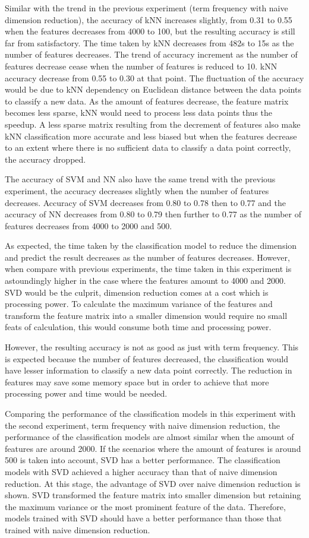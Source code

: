 Similar with the trend in the previous experiment (term frequency with naive dimension reduction), the accuracy of kNN increases slightly, from 0.31 to 0.55 when the features decreases from 4000 to 100, but the resulting accuracy is still far from satisfactory. The time taken by kNN decreases from 482s to 15s as the number of features decreases. The trend of accuracy increment as the number of features decrease cease when the number of features is reduced to 10. kNN accuracy decrease from 0.55 to 0.30 at that point. The fluctuation of the accuracy would be due to kNN dependency on Euclidean distance between the data points to classify a new data. As the amount of features decrease, the feature matrix becomes less sparse, kNN would need to process less data points thus the speedup. A less sparse matrix resulting from the decrement of features also make kNN classification more accurate and less biased but when the features decrease to an extent where there is no sufficient data to classify a data point correctly, the accuracy dropped.

The accuracy of SVM and NN also have the same trend with the previous experiment, the accuracy decreases slightly when the number of features decreases. Accuracy of SVM decreases from 0.80 to 0.78 then to 0.77 and the accuracy of NN decreases from 0.80 to 0.79 then further to 0.77 as the number of features decreases from 4000 to 2000 and 500.

As expected, the time taken by the classification model to reduce the dimension and predict the result decreases as the number of features decreases. However, when compare with previous experiments, the time taken in this experiment is astoundingly higher in the case where the features amount to 4000 and 2000. SVD would be the culprit, dimension reduction comes at a cost which is processing power. To calculate the maximum variance of the features and transform the feature matrix into a smaller dimension would require no small feats of calculation, this would consume both time and processing power.

However, the resulting accuracy is not as good as just with term frequency. This is expected because the number of features decreased, the classification would have lesser information to classify a new data point correctly. The reduction in features may save some memory space but in order to achieve that more processing power and time would be needed.

Comparing the performance of the classification models in this experiment with the second experiment, term frequency with naive dimension reduction, the performance of the classification models are almost similar when the amount of features are around 2000. If the scenarios where the amount of features is around 500 is taken into account, SVD has a better performance. The classification models with SVD achieved a higher accuracy than that of naive dimension reduction. At this stage, the advantage of SVD over naive dimension reduction is shown. SVD transformed the feature matrix into smaller dimension but retaining the maximum variance or the most prominent feature of the data. Therefore, models trained with SVD should have a better performance than those that trained with naive dimension reduction.


